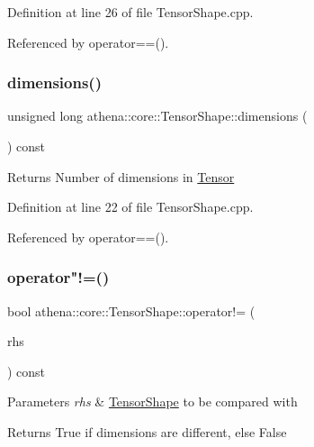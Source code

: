 Definition at line 26 of file Tensor\+Shape.\+cpp.



Referenced by operator==().

\mbox{\label{classathena_1_1core_1_1_tensor_shape_a73f686650f41bd7fa065aa16dfc4529f}} 
\subsubsection{\texorpdfstring{dimensions()}{dimensions()}}
{\footnotesize\ttfamily unsigned long athena\+::core\+::\+Tensor\+Shape\+::dimensions (\begin{DoxyParamCaption}{ }\end{DoxyParamCaption}) const}

\begin{DoxyReturn}{Returns}
Number of dimensions in \mbox{\hyperlink{classathena_1_1core_1_1_tensor}{Tensor}} 
\end{DoxyReturn}


Definition at line 22 of file Tensor\+Shape.\+cpp.



Referenced by operator==().

\mbox{\label{classathena_1_1core_1_1_tensor_shape_acdb5b20f9922cb4d7ee29a868fd05b1b}} 
\subsubsection{\texorpdfstring{operator"!=()}{operator!=()}}
{\footnotesize\ttfamily bool athena\+::core\+::\+Tensor\+Shape\+::operator!= (\begin{DoxyParamCaption}\item[{const \mbox{\hyperlink{classathena_1_1core_1_1_tensor_shape}{Tensor\+Shape}} \&}]{rhs }\end{DoxyParamCaption}) const}


\begin{DoxyParams}{Parameters}
{\em rhs} & \mbox{\hyperlink{classathena_1_1core_1_1_tensor_shape}{Tensor\+Shape}} to be compared with \\
\hline
\end{DoxyParams}
\begin{DoxyReturn}{Returns}
True if dimensions are different, else False 
\end{DoxyReturn}


